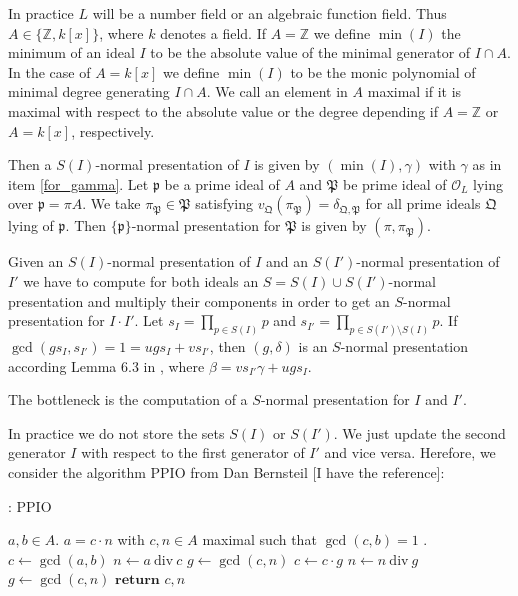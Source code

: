 \documentclass{amsart}
\theoremstyle{definition}
\def\p{\mathfrak{p}}
\def\P{\mathfrak{P}}
\def\Q{\mathfrak{Q}}
\def\oo{\mathcal{O}}
\def\Z{\mathbb{Z}}
\begin{document}
In practice $L$ will be a number field or an algebraic function field. Thus $A\in \{ \Z,k[x]\}$, where $k$ denotes a field. If $A=\Z$ we define $\min(I)$ the minimum of an ideal $I$ to be the absolute value of the minimal generator of $I\cap A$. In the case of $A=k[x]$ we define $\min(I)$ to be the monic polynomial of minimal degree generating $I\cap A$. We call an element in $A$ maximal if it is maximal with respect to the absolute value or the degree depending if $A=\Z$ or $A=k[x]$, respectively.

Then a $S(I)$-normal presentation of $I$ is given by $(\min(I),\gamma)$ with $\gamma$ as in item \ref{for_gamma}. Let $\p$ be a prime ideal of $A$ and $\P$ be prime ideal of $\oo_L$ lying over $\p=\pi A$. We take $\pi_\P\in \P$ satisfying $v_\Q(\pi_\P)=\delta_{\Q,\P}$ for all prime ideals $\Q$ lying of $\p$. Then $\{\p\}$-normal presentation for $\P$ is given by $(\pi,\pi_\P)$.




Given an $S(I)$-normal presentation of $I$ and an $S(I')$-normal presentation of $I'$ we have to compute for both ideals an $S=S(I)\cup S(I')$-normal presentation and multiply their components in order to get an $S$-normal presentation for $I\cdot I'$. Let $s_I=\prod_{p\in S(I)}p$ and $s_{I'}=\prod_{p\in S(I')\setminus S(I)}p$. If $\gcd(g s_I,s_{I'})=1=ug s_I+vs_{I'}$, then $(g,\delta)$ is an $S$-normal presentation according Lemma 6.3 in \cite{Fieker}, where $\beta = vs_{I'}\gamma+ug s_I$.

The bottleneck is the computation of a $S$-normal presentation for $I$ and $I'$.

In practice we do not store the sets $S(I)$ or $S(I')$. We just update the second generator $I$ with respect to the first generator of $I'$ and vice versa. Herefore, we consider the algorithm $\mathrm{PPIO}$ from Dan Bernsteil \cite{}[I have the reference]:






\begin{algorithm}
\caption{: PPIO}
\label{PPIO}
\begin{algorithmic}[1]

\REQUIRE $a,b\in A$. 
\ENSURE  $a=c\cdot n$ with $c,n\in A$ maximal such that $\gcd(c,b)=1$ .\\[0.25 cm]



\STATE   $c \longleftarrow \gcd(a,b)$
\STATE   $ n \longleftarrow a\ \mathrm{div}\ c$
\STATE   $ g\longleftarrow  \gcd(c,n)$
\STATE          $ c \longleftarrow c\cdot g$
\STATE           $ n \longleftarrow n\ \mathrm{div}\ g$
\STATE           $ g \longleftarrow \gcd(c,n)$
\ENDWHILE
\STATE    $\textbf{return }c,n$



\end{algorithmic}
\end{algorithm}
\end{document}
